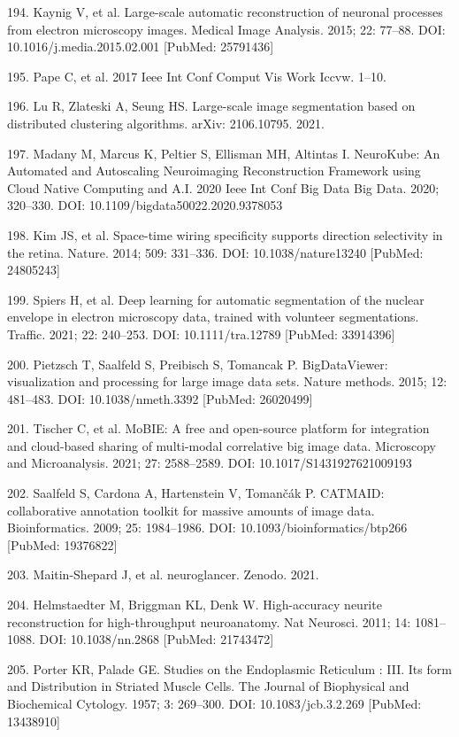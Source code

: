 \documentclass{article}
\begin{document}
\begin{hangpars}
194. Kaynig V, et al. Large-scale automatic reconstruction of neuronal processes from electron microscopy images. Medical Image Analysis. 2015; 22: 77–88. DOI: 10.1016/j.media.2015.02.001 [PubMed: 25791436]

195. Pape C, et al. 2017 Ieee Int Conf Comput Vis Work Iccvw. 1–10.

196. Lu R, Zlateski A, Seung HS. Large-scale image segmentation based on distributed clustering algorithms. arXiv: 2106.10795. 2021.

197. Madany M, Marcus K, Peltier S, Ellisman MH, Altintas I. NeuroKube: An Automated and Autoscaling Neuroimaging Reconstruction Framework using Cloud Native Computing and A.I. 2020 Ieee Int Conf Big Data Big Data. 2020; 320–330. DOI: 10.1109/bigdata50022.2020.9378053

198. Kim JS, et al. Space-time wiring specificity supports direction selectivity in the retina. Nature. 2014; 509: 331–336. DOI: 10.1038/nature13240 [PubMed: 24805243]

199. Spiers H, et al. Deep learning for automatic segmentation of the nuclear envelope in electron microscopy data, trained with volunteer segmentations. Traffic. 2021; 22: 240–253. DOI: 10.1111/tra.12789 [PubMed: 33914396]

200. Pietzsch T, Saalfeld S, Preibisch S, Tomancak P. BigDataViewer: visualization and processing for large image data sets. Nature methods. 2015; 12: 481–483. DOI: 10.1038/nmeth.3392 [PubMed: 26020499]

201. Tischer C, et al. MoBIE: A free and open-source platform for integration and cloud-based sharing of multi-modal correlative big image data. Microscopy and Microanalysis. 2021; 27: 2588–2589. DOI: 10.1017/S1431927621009193

202. Saalfeld S, Cardona A, Hartenstein V, Tomančák P. CATMAID: collaborative annotation toolkit for massive amounts of image data. Bioinformatics. 2009; 25: 1984–1986. DOI: 10.1093/bioinformatics/btp266 [PubMed: 19376822]

203. Maitin-Shepard J, et al. neuroglancer. Zenodo. 2021.

204. Helmstaedter M, Briggman KL, Denk W. High-accuracy neurite reconstruction for high-throughput neuroanatomy. Nat Neurosci. 2011; 14: 1081–1088. DOI: 10.1038/nn.2868 [PubMed: 21743472]

205. Porter KR, Palade GE. Studies on the Endoplasmic Reticulum : III. Its form and Distribution in Striated Muscle Cells. The Journal of Biophysical and Biochemical Cytology. 1957; 3: 269–300. DOI: 10.1083/jcb.3.2.269 [PubMed: 13438910]


\end{hangpars}
\end{document}
